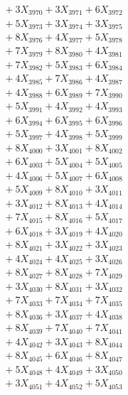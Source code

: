 \documentclass[a4paper,10pt]{article}
\begin{document}
{\begin{align}
&\;  + 3 X_{3970} + 3 X_{3971} + 6 X_{3972} \\[0.3ex]
&\;  + 5 X_{3973} + 3 X_{3974} + 3 X_{3975} \\[0.3ex]
&\;  + 8 X_{3976} + 4 X_{3977} + 5 X_{3978} \\[0.3ex]
&\;  + 7 X_{3979} + 8 X_{3980} + 4 X_{3981} \\[0.3ex]
&\;  + 7 X_{3982} + 5 X_{3983} + 6 X_{3984} \\[0.3ex]
&\;  + 4 X_{3985} + 7 X_{3986} + 4 X_{3987} \\[0.3ex]
&\;  + 4 X_{3988} + 6 X_{3989} + 7 X_{3990} \\[0.3ex]
&\;  + 5 X_{3991} + 4 X_{3992} + 4 X_{3993} \\[0.3ex]
&\;  + 6 X_{3994} + 6 X_{3995} + 6 X_{3996} \\[0.3ex]
&\;  + 5 X_{3997} + 4 X_{3998} + 5 X_{3999} \\[0.5ex]\allowbreak
&\;  + 8 X_{4000} + 3 X_{4001} + 8 X_{4002} \\[0.3ex]
&\;  + 6 X_{4003} + 5 X_{4004} + 5 X_{4005} \\[0.3ex]
&\;  + 4 X_{4006} + 5 X_{4007} + 6 X_{4008} \\[0.3ex]
&\;  + 5 X_{4009} + 8 X_{4010} + 3 X_{4011} \\[0.3ex]
&\;  + 3 X_{4012} + 8 X_{4013} + 4 X_{4014} \\[0.3ex]
&\;  + 7 X_{4015} + 8 X_{4016} + 5 X_{4017} \\[0.3ex]
&\;  + 6 X_{4018} + 3 X_{4019} + 4 X_{4020} \\[0.3ex]
&\;  + 8 X_{4021} + 3 X_{4022} + 3 X_{4023} \\[0.3ex]
&\;  + 4 X_{4024} + 4 X_{4025} + 3 X_{4026} \\[0.3ex]
&\;  + 8 X_{4027} + 8 X_{4028} + 7 X_{4029} \\[0.5ex]\allowbreak
&\;  + 3 X_{4030} + 8 X_{4031} + 3 X_{4032} \\[0.3ex]
&\;  + 7 X_{4033} + 7 X_{4034} + 7 X_{4035} \\[0.3ex]
&\;  + 8 X_{4036} + 3 X_{4037} + 4 X_{4038} \\[0.3ex]
&\;  + 8 X_{4039} + 7 X_{4040} + 7 X_{4041} \\[0.3ex]
&\;  + 4 X_{4042} + 3 X_{4043} + 8 X_{4044} \\[0.3ex]
&\;  + 8 X_{4045} + 6 X_{4046} + 8 X_{4047} \\[0.3ex]
&\;  + 5 X_{4048} + 4 X_{4049} + 3 X_{4050} \\[0.3ex]
&\;  + 3 X_{4051} + 4 X_{4052} + 5 X_{4053} \\[0.3ex]

\end{align}}
\end{document}
